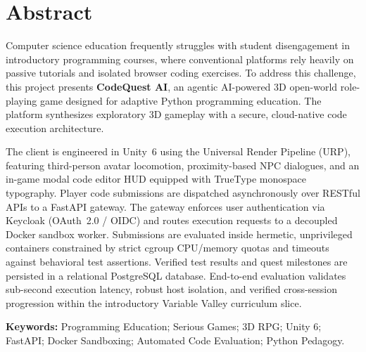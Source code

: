 {}
\chapter*{Abstract}

Computer science education frequently struggles with student disengagement in introductory programming courses, where conventional platforms rely heavily on passive tutorials and isolated browser coding exercises. To address this challenge, this project presents \textbf{CodeQuest AI}, an agentic AI-powered 3D open-world role-playing game designed for adaptive Python programming education. The platform synthesizes exploratory 3D gameplay with a secure, cloud-native code execution architecture. 

The client is engineered in Unity~6 using the Universal Render Pipeline (URP), featuring third-person avatar locomotion, proximity-based NPC dialogues, and an in-game modal code editor HUD equipped with TrueType monospace typography. Player code submissions are dispatched asynchronously over RESTful APIs to a FastAPI gateway. The gateway enforces user authentication via Keycloak (OAuth~2.0 / OIDC) and routes execution requests to a decoupled Docker sandbox worker. Submissions are evaluated inside hermetic, unprivileged containers constrained by strict cgroup CPU/memory quotas and timeouts against behavioral test assertions. Verified test results and quest milestones are persisted in a relational PostgreSQL database. End-to-end evaluation validates sub-second execution latency, robust host isolation, and verified cross-session progression within the introductory Variable Valley curriculum slice.

\vspace{0.6cm}
\noindent\textbf{Keywords:} Programming Education; Serious Games; 3D RPG; Unity 6; FastAPI; Docker Sandboxing; Automated Code Evaluation; Python Pedagogy.
